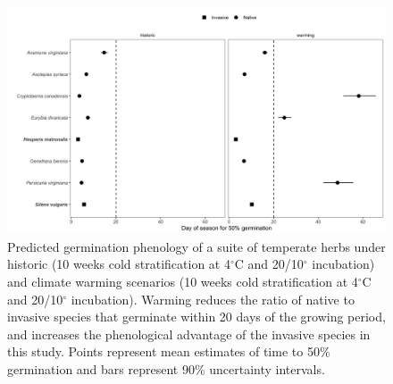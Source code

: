\documentclass{article}[11pt]
\begin{document}
\begin{figure}[h!]
    \centering
\includegraphics[width=\textwidth]{..//figure/commchange.jpeg}
   \caption{Predicted germination phenology of a suite of temperate herbs under historic (10 weeks cold stratification at 4$^{\circ}$C and  20/10$^{\circ}$ incubation)  and climate warming scenarios (10 weeks cold stratification at 4$^{\circ}$C and  20/10$^{\circ}$ incubation).  Warming reduces the ratio of native to invasive species that germinate within 20 days of the growing period, and increases the phenological advantage of the invasive species in this study. Points represent mean estimates of time to 50\% germination and bars represent 90\% uncertainty intervals. } 
   \label{fig:comm}
\end{figure}
\end{document}
